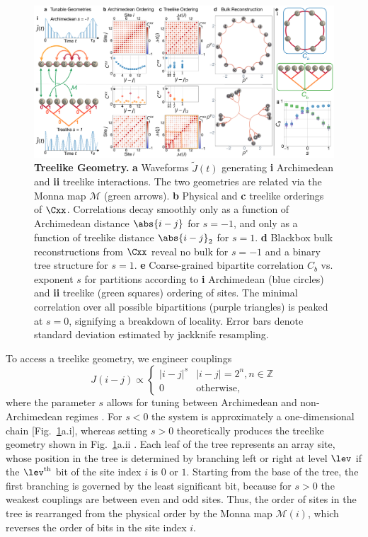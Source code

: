 \documentclass[aps,pra,twocolumn,superscriptaddress]{revtex4-1} %
\begin{document}
\begin{bibunit}
\begin{figure}[tbh]
\includegraphics[width=\textwidth]{Figures/Figure4.pdf}
\caption{\textbf{Treelike Geometry.} \textbf{a} Waveforms $\tilde{J}(t)$ generating \textbf{i} Archimedean and \textbf{ii} treelike interactions.  The two geometries are related via the Monna map $\mathcal{M}$ (green arrows). \textbf{b} Physical and \textbf{c} treelike orderings of $\Cxx$.  Correlations decay smoothly only as a function of Archimedean distance $\abs{i-j}$ for $s = -1$, and only as a function of treelike distance $\abs{i-j}_2$ for $s = 1$.  \textbf{d} Blackbox bulk reconstructions from $\Cxx$ reveal no bulk for $s = -1$ and a binary tree structure for $s = 1$. \textbf{e} Coarse-grained bipartite correlation $C_b$ vs. exponent $s$ for partitions according to \textbf{i} Archimedean (blue circles) and \textbf{ii} treelike (green squares) ordering of sites. The minimal correlation over all possible bipartitions (purple triangles) is peaked at $s = 0$, signifying a breakdown of locality. Error bars denote standard deviation estimated by jackknife resampling. }
\label{fig:trees}
\end{figure}

To access a treelike geometry, we engineer couplings
\begin{equation}\label{eq:tree_couplings}
  J(i - j) \propto 
  \begin{cases}
    |i - j|^s & |i - j| = 2^n, n\in \mathbb{Z}\\
    0 & \mathrm{otherwise},
  \end{cases}
\end{equation}
where the parameter $s$ allows for tuning between Archimedean and non-Archimedean regimes \cite{bentsen2019treelike}.  For $s < 0$ the system is approximately a one-dimensional chain [Fig.~\ref{fig:trees}a.i], whereas setting $s>0$ theoretically produces the treelike geometry shown in Fig.~\ref{fig:trees}a.ii \cite{gubser2018continuum, bentsen2019treelike}.  Each leaf of the tree represents an array site, whose position in the tree is determined by branching left or right at level $\lev$ if the $\lev^\mathrm{th}$ bit of the site index $i$ is $0$ or $1$.  Starting from the base of the tree, the first branching is governed by the least significant bit, because for $s>0$ the weakest couplings are between even and odd sites.  Thus, the order of sites in the tree is rearranged from the physical order by the Monna map $\mathcal{M}(i)$, which reverses the order of bits in the site index $i$.


\end{bibunit}
\end{document}
